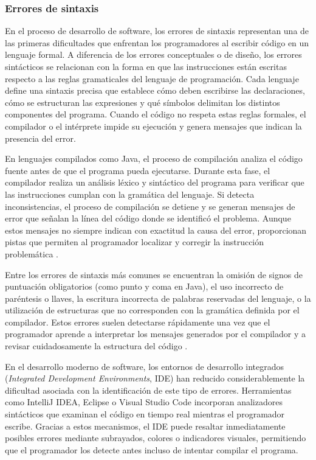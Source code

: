 \documentclass[12pt,twoside]{book}
\begin{document}
					\subsubsection{Errores de sintaxis}
						\noindent
						En el proceso de desarrollo de software, los errores de sintaxis representan una de las primeras dificultades que enfrentan los programadores al escribir código en un lenguaje formal. A diferencia de los errores conceptuales o de diseño, los errores sintácticos se relacionan con la forma en que las instrucciones están escritas respecto a las reglas gramaticales del lenguaje de programación. Cada lenguaje define una sintaxis precisa que establece cómo deben escribirse las declaraciones, cómo se estructuran las expresiones y qué símbolos delimitan los distintos componentes del programa. Cuando el código no respeta estas reglas formales, el compilador o el intérprete impide su ejecución y genera mensajes que indican la presencia del error.
						
						En lenguajes compilados como Java, el proceso de compilación analiza el código fuente antes de que el programa pueda ejecutarse. Durante esta fase, el compilador realiza un análisis léxico y sintáctico del programa para verificar que las instrucciones cumplan con la gramática del lenguaje. Si detecta inconsistencias, el proceso de compilación se detiene y se generan mensajes de error que señalan la línea del código donde se identificó el problema. Aunque estos mensajes no siempre indican con exactitud la causa del error, proporcionan pistas que permiten al programador localizar y corregir la instrucción problemática \cite{Deitel2025Java,Gaddis2022Starting}.
						
						Entre los errores de sintaxis más comunes se encuentran la omisión de signos de puntuación obligatorios (como punto y coma en Java), el uso incorrecto de paréntesis o llaves, la escritura incorrecta de palabras reservadas del lenguaje, o la utilización de estructuras que no corresponden con la gramática definida por el compilador. Estos errores suelen detectarse rápidamente una vez que el programador aprende a interpretar los mensajes generados por el compilador y a revisar cuidadosamente la estructura del código \cite{Gaddis2022Starting,Farrell2018Programming}.
						
						En el desarrollo moderno de software, los entornos de desarrollo integrados (\textit{Integrated Development Environments}, IDE) han reducido considerablemente la dificultad asociada con la identificación de este tipo de errores. Herramientas como IntelliJ IDEA, Eclipse o Visual Studio Code incorporan analizadores sintácticos que examinan el código en tiempo real mientras el programador escribe. Gracias a estos mecanismos, el IDE puede resaltar inmediatamente posibles errores mediante subrayados, colores o indicadores visuales, permitiendo que el programador los detecte antes incluso de intentar compilar el programa.
						
\end{document}
